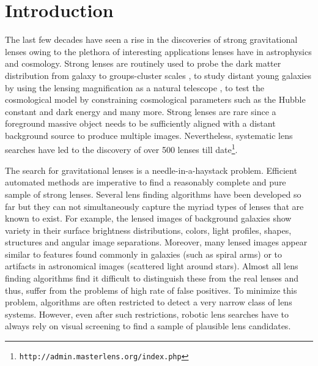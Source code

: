 \documentclass[useAMS,usenatbib,a4paper]{mn2e}
\begin{document}
\setcounter{footnote}{1}


\section{Introduction}
\label{sec:intro}

The last few decades have seen a rise in the discoveries of strong
gravitational lenses owing to the plethora of interesting applications
lenses have in astrophysics and cosmology. Strong lenses are routinely
used to probe the dark matter distribution from galaxy
\citep[e.g.][]{Koopmans2006,Barnabe2009,Leier2011,Sonnenfeld2015} to groups-cluster
scales
\citep[e.g.][]{Limousin2008,Zitrin2011,Oguri2012,More2012,Newman2013}, to
study distant young galaxies by using the lensing magnification as a
natural telescope \citep[e.g.][]{Zitrin2009,Zheng2012,Whitaker2014}, to
test the cosmological model by constraining cosmological parameters such
as the Hubble constant and dark energy
\citep[e.g.][]{Suyu2010,Collett2012,Collett2014,Sereno2014} and many more. Strong
lenses are rare since a foreground massive object needs to be
sufficiently aligned with a distant background source to produce
multiple images. Nevertheless, systematic lens searches have led to the
discovery of over 500 lenses till
date\footnote{\texttt{http://admin.masterlens.org/index.php}}.

The search for gravitational lenses is a needle-in-a-haystack problem.
Efficient automated methods are imperative to find a reasonably complete
and pure sample of strong lenses. Several lens finding algorithms have
been developed so far
\citep[e.g.][]{Lenzen2004,Alard2006,Seidel2007,More2012,Brault2014,Gavazzi2014} but they can not
simultaneously capture the myriad types of lenses that are known to
exist. For example, the lensed images of background galaxies show
variety in their surface brightness distributions, colors, light
profiles, shapes, structures and angular image separations.  Moreover,
many lensed images appear similar to features found commonly in galaxies
(such as spiral arms) or to artifacts in astronomical images (scattered
light around stars).  Almost all lens finding algorithms find it
difficult to distinguish these from the real lenses and thus, suffer
from the problems of high rate of false positives.  To minimize this problem,
algorithms are often restricted to detect a very narrow class of lens
systems. However, even after such restrictions, robotic lens searches
have to always rely on visual screening to find a sample of plausible
lens candidates.
\end{document}
